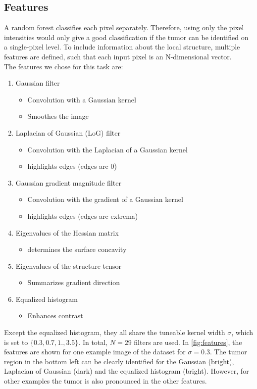 \documentclass[final]{article}
\begin{document}
\subsection{Features}
A random forest classifies each pixel separately. Therefore, using only the
pixel intensities would only give a good classification if the tumor can be
identified on a single-pixel level. To include information about the local
structure, multiple features are defined, such that each input pixel is an
N-dimensional vector.\\ The features we chose for this task are:
\begin{enumerate}
\item Gaussian filter
\begin{itemize}
\item Convolution with a Gaussian kernel
\item Smoothes the image
\end{itemize}
\item Laplacian of Gaussian (LoG) filter
\begin{itemize}
\item Convolution with the Laplacian of a Gaussian kernel
\item highlights edges (edges are 0)
\end{itemize}
\item Gaussian gradient magnitude filter
\begin{itemize}
\item Convolution with the gradient of a Gaussian kernel
\item highlights edges (edges are extrema)
\end{itemize}
\item Eigenvalues of the Hessian matrix
\begin{itemize}
\item determines the surface concavity
\end{itemize}
\item Eigenvalues of the structure tensor
\begin{itemize}
\item Summarizes gradient direction
\end{itemize}
\item Equalized histogram
\begin{itemize}
\item Enhances contrast
\end{itemize}
\end{enumerate}

Except the equalized histogram, they all share the tuneable kernel width
$\sigma$, which is set to $\{0.3, 0.7, 1., 3.5\}$. In total, $N=29$ filters are
used. In \cref{fig:features}, the features are shown for one example image of
the dataset for $\sigma = 0.3$. The tumor region in the bottom left can be
clearly identified for the Gaussian (bright), Laplacian of Gaussian (dark) and
the equalized histogram (bright). However, for other examples the tumor is also
pronounced in the other features.
\end{document}
